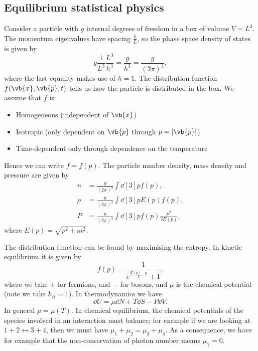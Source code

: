 \documentclass{jknotes}
\begin{document}
\subsection{Equilibrium statistical physics}
Consider a particle with \(g\) internal degrees of freedom in a box of volume \(V=L^3\). The momentum eigenvalues have spacing \(\frac{h}{L}\), so the phase space density of states is given by
\begin{equation}
    g\frac1{L^3}\frac{L^3}{h^3} = \frac{g}{h^3} = \frac{g}{(2\pi)^3},
\end{equation}
where the last equality makes use of \(\hbar = 1\). The distribution function \(f(\vb{x},\vb{p},t)\) tells us how the particle is distributed in the box. We assume that \(f\) is:
\begin{itemize}
    \item Homogeneous (independent of \(\vb{x}\))
    \item Isotropic (only dependent on \(\vb{p}\) through \(p = |\vb{p}|\))
    \item Time-dependent only through dependence on the temperature
\end{itemize}
Hence we can write \(f = f(p)\). The particle number density, mass density and pressure are given by
\begin{align}
    n &= \frac{g}{(2\pi)^3}\int\dd[3]{p}f(p), \\
    \rho &= \frac{g}{(2\pi)^3}\int\dd[3]{p}E(p)f(p), \\
    P &= \frac{g}{(2\pi)^3}\int\dd[3]{p}f(p)\frac{p^2}{3E(p)},
\end{align}
where \(E(p) = \sqrt{p^2+m^2}\).

The distribution function can be found by maximising the entropy. In kinetic equilibrium it is given by
\begin{equation}
    f(p) = \frac1{e^{\frac{E(p)-\mu}{T}}\pm 1},
\end{equation}
where we take \(+\) for fermions, and \(-\) for bosons, and \(\mu\) is the chemical potential (note we take \(k_B=1\)). In thermodynamics we have
\begin{equation}
    \dd{U} = \mu\dd{N} + T\dd{S} - P\dd{V}.
\end{equation}
In general \(\mu = \mu(T)\). In chemical equilibrium, the chemical potentials of the species involved in an interaction must balance; for example if we are looking at \(1+2\leftrightarrow3+4\), then we must have \(\mu_1 + \mu_2 = \mu_3 + \mu_4\). As a consequence, we have for example that the non-conservation of photon number means \(\mu_\gamma=0\).
\end{document}

